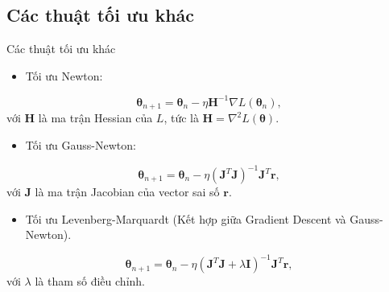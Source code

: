 \subsection{Các thuật tối ưu khác}

\begin{frame}{Các thuật tối ưu khác}
    \begin{itemize}
        \item Tối ưu Newton:
    \end{itemize}
    \begin{equation}
        \boldsymbol{\theta}_{n+1} = \boldsymbol{\theta}_n - \eta \mathbf{H}^{-1} \nabla L(\boldsymbol{\theta}_n),
    \end{equation}
    với \(\mathbf{H}\) là ma trận Hessian của \(L\), tức là \(\mathbf{H} = \nabla^2 L(\boldsymbol{\theta})\).
    \begin{itemize}
        \item Tối ưu Gauss-Newton:
    \end{itemize}
    \begin{equation}
        \boldsymbol{\theta}_{n+1} = \boldsymbol{\theta}_n - \eta (\mathbf{J}^T \mathbf{J})^{-1} \mathbf{J}^T \mathbf{r},
    \end{equation}
    với \(\mathbf{J}\) là ma trận Jacobian của vector sai số \(\mathbf{r}\).
    \begin{itemize}
        \item Tối ưu Levenberg-Marquardt (Kết hợp giữa Gradient Descent và Gauss-Newton).
    \end{itemize}
    \begin{equation}
        \boldsymbol{\theta}_{n+1} = \boldsymbol{\theta}_n - \eta (\mathbf{J}^T \mathbf{J} + \lambda \mathbf{I})^{-1} \mathbf{J}^T \mathbf{r},
    \end{equation}
    với \(\lambda\) là tham số điều chỉnh.
\end{frame}

